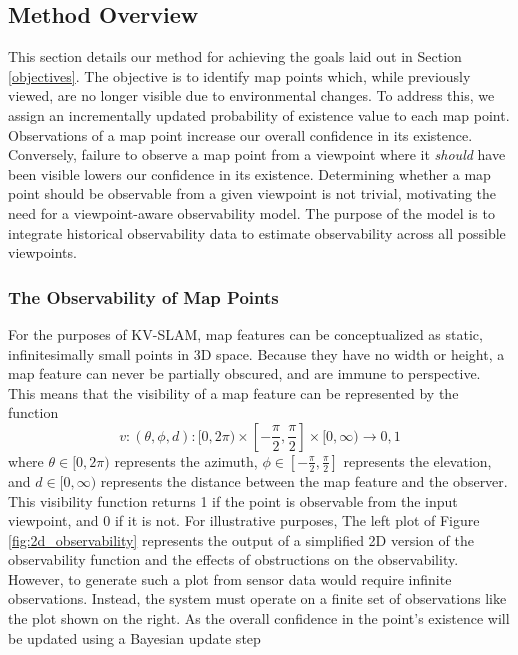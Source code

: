 \subsection{Method Overview}

This section details our method for achieving the goals laid out in Section \ref{objectives}. The objective is to identify map points which, while previously viewed, are no longer visible due to environmental changes. To address this, we assign an incrementally updated probability of existence value to each map point. Observations of a map point increase our overall confidence in its existence. Conversely, failure to observe a map point from a viewpoint where it \textit{should} have been visible lowers our confidence in its existence. Determining whether a map point should be observable from a given viewpoint is not trivial, motivating the need for a viewpoint-aware observability model. The purpose of the model is to integrate historical observability data to estimate observability across all possible viewpoints.

\subsubsection{The Observability of Map Points}

For the purposes of KV-SLAM, map features can be conceptualized as static, infinitesimally small points in 3D space. Because they have no width or height, a map feature can never be partially obscured, and are immune to perspective. This means that the visibility of a map feature can be represented by the function
$$
    v:(\theta,\phi,d):[0,2\pi)\times\left[-\frac{\pi}{2},\frac{\pi}{2}\right]\times[0,\infty)\to{0,1}
$$
where $\theta\in[0,2\pi)$ represents the azimuth, $\phi\in\left[-\frac{\pi}{2},\frac{\pi}{2}\right]$ represents the elevation, and $d\in[0,\infty)$ represents the distance between the map feature and the observer. This visibility function returns 1 if the point is observable from the input viewpoint, and 0 if it is not. For illustrative purposes, The left plot of Figure \ref{fig:2d_observability} represents the output of a simplified 2D version of the observability function and the effects of obstructions on the observability. However, to generate such a plot from sensor data would require infinite observations. Instead, the system must operate on a finite set of observations like the plot shown on the right. As the overall confidence in the point's existence will be updated using a Bayesian update step

